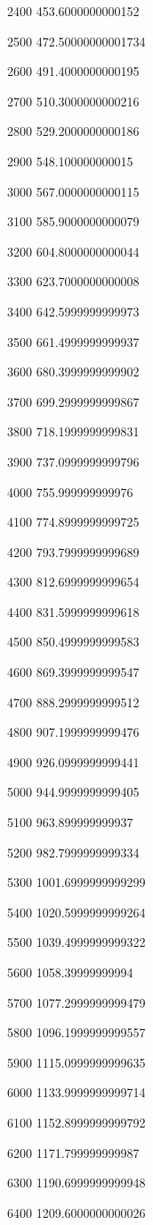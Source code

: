 \documentclass[a4paper, 12pt, oneside]{extarticle}
\begin{document}
\begin{longtable}[]
{2400 453.6000000000152

2500 472.50000000001734

2600 491.4000000000195

2700 510.3000000000216

2800 529.2000000000186

2900 548.100000000015

3000 567.0000000000115

3100 585.9000000000079

3200 604.8000000000044

3300 623.7000000000008

3400 642.5999999999973

3500 661.4999999999937

3600 680.3999999999902

3700 699.2999999999867

3800 718.1999999999831

3900 737.0999999999796

4000 755.999999999976

4100 774.8999999999725

4200 793.7999999999689

4300 812.6999999999654

4400 831.5999999999618

4500 850.4999999999583

4600 869.3999999999547

4700 888.2999999999512

4800 907.1999999999476

4900 926.0999999999441

5000 944.9999999999405

5100 963.899999999937

5200 982.7999999999334

5300 1001.6999999999299

5400 1020.5999999999264

5500 1039.4999999999322

5600 1058.39999999994

5700 1077.2999999999479

5800 1096.1999999999557

5900 1115.0999999999635

6000 1133.9999999999714

6100 1152.8999999999792

6200 1171.799999999987

6300 1190.6999999999948

6400 1209.6000000000026

}
\end{longtable}
\end{document}
